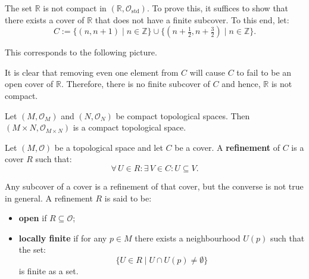 \documentclass[root.tex]{subfiles}
\begin{document}
\begin{myex}
The set $\mathbb{R}$ is not compact in $(\mathbb{R},\mathcal{O}_\mathrm{std})$. To prove this, it suffices to show that there exists a cover of $\mathbb{R}$ that does not have a finite subcover. To this end, let:
$$
C := \{(n,n+1)\mid n \in \mathbb{Z}\} \cup \{(n+\tfrac{1}{2},n+\tfrac{3}{2})\mid n \in \mathbb{Z}\} .
$$

This corresponds to the following picture.

\begin{figure}[h!]
\centering
{}
\end{figure}

It is clear that removing even one element from $C$ will cause $C$ to fail to be an open cover of $\mathbb{R}$. Therefore, there is no finite subcover of $C$ and hence, $\mathbb{R}$ is not compact.
\end{myex}

\begin{theorem}
Let $(M,\mathcal{O}_M)$ and $(N,\mathcal{O}_N)$ be compact topological spaces. Then $(M\times N,\mathcal{O}_{M\times N})$ is a compact topological space.
\end{theorem}

\begin{mydef}
Let $(M,\mathcal{O})$ be a topological space and let $C$ be a cover. A \textbf{refinement} of $C$ is a cover $R$ such that:
$$
\forall \, U \in R : \exists \, V \in C : U \subseteq V .
$$
\end{mydef}
Any subcover of a cover is a refinement of that cover, but the converse is not true in general. A refinement $R$ is said to be:
\begin{itemize}
\item \textbf{open} if $R\subseteq \mathcal{O}$;
\item \textbf{locally finite} if for any $p\in M$ there exists a neighbourhood $U(p)$ such that the set:
$$
\{U \in R \mid U \cap U(p) \neq \emptyset\}
$$
is finite as a set.
\end{itemize}
\end{document}
